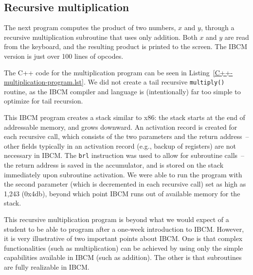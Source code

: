 \subsection{Recursive multiplication}

The next program computes the product of two numbers, $x$ and $y$,
through a recursive multiplication subroutine that uses only addition.
Both $x$ and $y$ are read from the keyboard, and the resulting product
is printed to the screen. The IBCM version is just over 100 lines of
opcodes.

\begin{figure}
\vspace{-0.15in}

\vspace{-0.4in}
\end{figure}

The C++ code for the multiplication program can be seen in
Listing~\ref{C++-multiplication-program.lst}.  We did not create a
tail recursive {\tt multiply()} routine, as the IBCM compiler and
language is (intentionally) far too simple to optimize for tail
recursion.

This IBCM program creates a stack similar to x86: the stack starts at
the end of addressable memory, and grows downward.  An activation
record is created for each recursive call, which consists of the two
parameters and the return address~-- other fields typically in an
activation record (e.g., backup of registers) are not necessary in
IBCM.  The {\tt brl} instruction was used to allow for subroutine
calls~-- the return address is saved in the accumulator, and is stored
on the stack immediately upon subroutine activation.  We were able to
run the program with the second parameter (which is decremented in
each recursive call) set as high as 1,243 (0x4db), beyond which point
IBCM runs out of available memory for the stack.

This recursive multiplication program is beyond what we would expect
of a student to be able to program after a one-week introduction to
IBCM.  However, it is very illustrative of two important points about
IBCM.  One is that complex functionalities (such as multiplication)
can be achieved by using only the simple capabilities available in
IBCM (such as addition).  The other is that subroutines are fully
realizable in IBCM.

